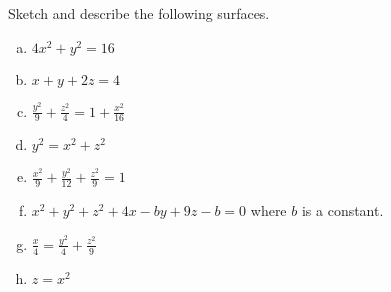 \begin{question}
Sketch and describe the following surfaces.
\begin{enumerate}[(a)]
\item %
$4x^2+y^2=16$

\item %
$x+y+2z=4$  

\item %
$\frac{y^2}{9}+\frac{z^2}{4}=1+\frac{x^2}{16}$ 

\item %
$y^2=x^2+z^2$

\item %
$\frac{x^2}{9}+\frac{y^2}{12}+\frac{z^2}{9}=1$

\item %
$x^2+y^2+z^2+4x-by+9z-b=0$ where $b$ is a constant.

\item %
 $\frac{x}{4}=\frac{y^2}{4}+\frac{z^2}{9}$ 

\item %
$z=x^2$



\end{enumerate}

\end{question}

%

